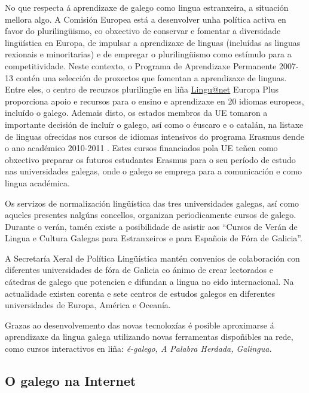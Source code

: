 \begin{multicols}{2}
No que respecta á aprendizaxe de galego como lingua estranxeira, a situación mellora algo. A Comisión Europea está a desenvolver unha política activa en favor do plurilingüismo, co obxectivo de conservar e fomentar a diversidade lingüística en Europa, de impulsar a aprendizaxe de linguas (incluídas as linguas rexionais e minoritarias) e de empregar o plurilingüismo como estímulo para a competitividade. Neste contexto, o Programa de Aprendizaxe Permanente 2007-13 contén una selección de proxectos que fomentan a aprendizaxe de linguas. Entre eles, o centro de recursos plurilingüe en liña  \uline{Lingu@net} Europa Plus \cite{GAL-Nota14}  proporciona apoio e recursos para o ensino e aprendizaxe en 20 idiomas europeos, incluído o galego. Ademais disto, os estados membros da UE tomaron a importante decisión de incluír o galego, así como o éuscaro e o catalán, na listaxe de linguas ofrecidas nos cursos de idiomas intensivos do programa Erasmus dende o ano académico 2010-2011 \cite{GAL-Nota15}. Estes cursos financiados pola UE teñen como obxectivo preparar os futuros estudantes Erasmus para o seu período de estudo nas universidades galegas, onde o galego se emprega para a comunicación e como lingua académica. 

Os servizos de normalización lingüística das tres universidades galegas, así como aqueles presentes nalgúns concellos, organizan periodicamente cursos de galego. Durante o verán, tamén existe a posibilidade de asistir aos “Cursos de Verán de Lingua e Cultura Galegas para Estranxeiros e para Españois de Fóra de Galicia”. 

A Secretaría Xeral de Política Lingüística mantén convenios de colaboración con diferentes universidades de fóra de Galicia co ánimo de crear lectorados e cátedras de galego que potencien e difundan a lingua no eido internacional. Na actualidade existen corenta e sete centros de estudos galegos en diferentes universidades de Europa, América e Oceanía.

Grazas ao desenvolvemento das novas tecnoloxías é posible aproximarse á aprendizaxe da lingua galega utilizando novas ferramentas dispoñibles na rede, como cursos interactivos en liña: \textit{é-galego, A Palabra Herdada, Galingua.}

\subsection{O galego na Internet}


\end{multicols}
